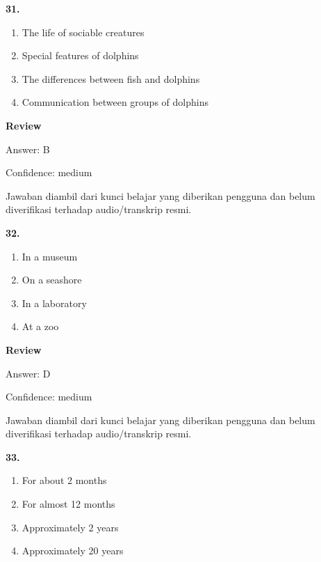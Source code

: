 \documentclass[12pt]{article}
\begin{document}
\noindent\textbf{31.}
\begin{enumerate}[label=(\Alph*),leftmargin=*,itemsep=0.2em]
\item The life of sociable creatures
\item Special features of dolphins
\item The differences between fish and dolphins
\item Communication between groups of dolphins
\end{enumerate}
\par
\begingroup
\setlength{\parskip}{0pt}
\setlength{\parindent}{0pt}
\textbf{Review}\par
Answer: B\par
Confidence: medium\par
Jawaban diambil dari kunci belajar yang diberikan pengguna dan belum diverifikasi terhadap audio/transkrip resmi.\par
\endgroup
\par
\vspace{0.25\baselineskip}
\noindent\textbf{32.}
\begin{enumerate}[label=(\Alph*),leftmargin=*,itemsep=0.2em]
\item In a museum
\item On a seashore
\item In a laboratory
\item At a zoo
\end{enumerate}
\par
\begingroup
\setlength{\parskip}{0pt}
\setlength{\parindent}{0pt}
\textbf{Review}\par
Answer: D\par
Confidence: medium\par
Jawaban diambil dari kunci belajar yang diberikan pengguna dan belum diverifikasi terhadap audio/transkrip resmi.\par
\endgroup
\par
\vspace{0.25\baselineskip}
\noindent\textbf{33.}
\begin{enumerate}[label=(\Alph*),leftmargin=*,itemsep=0.2em]
\item For about 2 months
\item For almost 12 months
\item Approximately 2 years
\item Approximately 20 years
\end{enumerate}
\par
\begingroup
\setlength{\parskip}{0pt}
\setlength{\parindent}{0pt}
\end{document}
